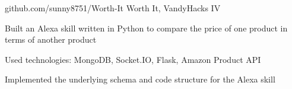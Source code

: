 \documentclass[
    changecolor={0, 38, 58},
]{pranav-resume}
\begin{document}
\cventry
  {github.com/sunny8751/Worth-It}
  {Worth It, VandyHacks IV}
	{}
	{}
  {
    \begin{cvitems}
	\item{Built an Alexa skill written in Python to compare the price of one product in terms of another product}
	\item{Used technologies: MongoDB, Socket.IO, Flask, Amazon Product API}
	\item{Implemented the underlying schema and code structure for the Alexa skill}
    \end{cvitems}
  }

  \begin{cvskills}
  \end{cvskills}
\end{document}
